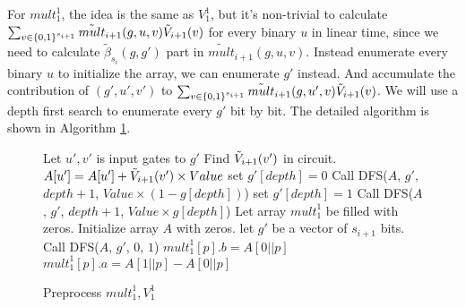 {{{	For ${mult}_1^1$, the idea is the same as ${V}_1^1$, but it's non-trivial to calculate $\sum_{v\in \{0,1\}^{s_{i+1}}}\tilde{mult}_{i+1}(g, u, v)\tilde{V}_{i+1}(v)$ for every binary $u$ in linear time, since we need to calculate $\tilde{\beta}_{s_{i}}(g, g')$ part in $\tilde{mult}_{i+1}(g, u, v)$. Instead enumerate every binary $u$ to initialize the array, we can enumerate $g'$ instead. And accumulate the contribution of $(g', u', v')$ to $\sum_{v\in \{0,1\}^{s_{i+1}}}\tilde{mult}_{i+1}(g, u', v)\tilde{V}_{i+1}(v)$. We will use a depth first search to enumerate every $g'$ bit by bit. The detailed algorithm is shown in Algorithm \ref{alg::premult}.
	\begin{figure}[p]
		\begin{algorithm}[H]
			\label{alg::premult}
			\caption{Preprocess ${mult}_1^1, {V}_1^1$}
			\begin{algorithmic}[1]
				 
				\State Let $u', v'$ is input gates to $g'$
				\State Find $\tilde{V}_{i+1}(v')$ in circuit.
				\State $A[u'] = A[u'] + \tilde{V}_{i+1}(v')\times Value$
				\Else
				\State set $g'[depth]=0$
				\State Call {\sf DFS}($A$, $g'$, $depth+1$, $Value\times(1-g[depth])$)
				\State set $g'[depth]=1$
				\State Call {\sf DFS}($A$, $g'$, $depth+1$, $Value\times g[depth]$)
				\EndIf
				\EndProcedure
				\State Let array ${mult}_1^1$ be filled with zeros.
				\State Initialize array $A$ with zeros.
				\State let $g'$ be a vector of $s_{i+1}$ bits.
				\State Call {\sf DFS}($A$, $g'$, $0$, $1$)
				\State ${mult}_1^1[p].b=A[0||p]$
				\State ${mult}_1^1[p].a=A[1||p]-A[0||p]$
				\EndFor
				\EndProcedure
			\end{algorithmic}
		\end{algorithm}
	\end{figure}
	
}}}
